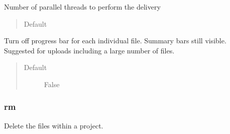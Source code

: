 \documentclass[letterpaper,10pt,english]{sphinxmanual}
\begin{document}
\begin{fulllineitems}
\label{\detokenize{usage:cmdoption-dds-put-nt}}
\sphinxAtStartPar
Number of parallel threads to perform the delivery
\begin{quote}\begin{description}
\item[{Default}] \leavevmode
{}

\end{description}\end{quote}

\end{fulllineitems}


\begin{fulllineitems}
\label{\detokenize{usage:cmdoption-dds-put-silent}}
\sphinxAtStartPar
Turn off progress bar for each individual file. Summary bars still visible. Suggested for uploads including a large number of files.
\begin{quote}\begin{description}
\item[{Default}] \leavevmode
\sphinxAtStartPar
False

\end{description}\end{quote}

\end{fulllineitems}



\subsubsection{rm}
\label{\detokenize{usage:dds-rm}}
\sphinxAtStartPar
Delete the files within a project.
\end{document}
